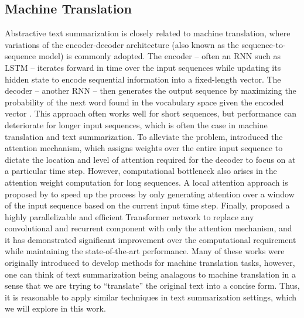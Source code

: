 \subsection{Machine Translation}
Abstractive text summarization is closely related to machine translation, where variations of the encoder-decoder architecture (also known as the sequence-to-sequence model) is commonly adopted. The encoder -- often an RNN such as LSTM -- iterates forward in time over the input sequences while updating its hidden state to encode sequential information into a fixed-length vector. The decoder -- another RNN -- then generates the output sequence by maximizing the probability of the next word found in the vocabulary space given the encoded vector \cite{sutskever2014sequence,cho2014learning}. This approach often works well for short sequences, but performance can deteriorate for longer input sequences, which is often the case in machine translation and text summarization. To alleviate the problem, \cite{bahdanau2014neural} introduced the attention mechanism, which assigns weights over the entire input sequence to dictate the location and level of attention required for the decoder to focus on at a particular time step. However, computational bottleneck also arises in the attention weight computation for long sequences. A local attention approach is proposed by \cite{luong2015effective} to speed up the process by only generating attention over a window of the input sequence based on the current input time step. Finally, \cite{vaswani2017attention} proposed a highly parallelizable and efficient Transformer network to replace any convolutional and recurrent component with only the attention mechanism, and it has demonstrated significant improvement over the computational requirement while maintaining the state-of-the-art performance. Many of these works were originally introduced to develop methods for machine translation tasks, however, one can think of text summarization being analagous to machine translation in a sense that we are trying to ``translate'' the original text into a concise form. Thus, it is reasonable to apply similar techniques in text summarization settings, which we will explore in this work.

